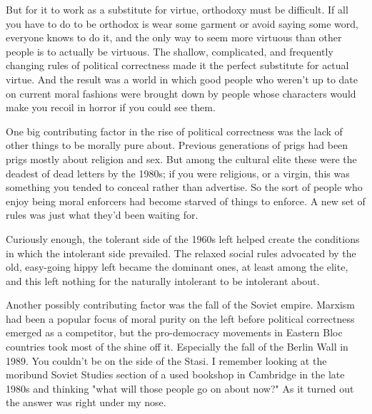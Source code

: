 But for it to work as a substitute for
                  virtue, orthodoxy must be difficult. If all you have to do to
                  be orthodox is wear some garment or avoid saying some word,
                  everyone knows to do it, and the only way to seem more
                  virtuous than other people is to actually be virtuous. The
                  shallow, complicated, and frequently changing rules of
                  political correctness made it the perfect substitute for
                  actual virtue. And the result was a world in which good people
                  who weren't up to date on current moral fashions were brought
                  down by people whose characters would make you recoil in
                  horror if you could see them.

One big contributing
                  factor in the rise of political correctness was the lack of
                  other things to be morally pure about. Previous generations of
                  prigs had been prigs mostly about religion and sex. But among
                  the cultural elite these were the deadest of dead letters by
                  the 1980s; if you were religious, or a virgin, this was
                  something you tended to conceal rather than advertise. So the
                  sort of people who enjoy being moral enforcers had become
                  starved of things to enforce. A new set of rules was just what
                  they'd been waiting for.

Curiously enough, the
                  tolerant side of the 1960s left helped create the conditions
                  in which the intolerant side prevailed. The relaxed social
                  rules advocated by the old, easy-going hippy left became the
                  dominant ones, at least among the elite, and this left nothing
                  for the naturally intolerant to be intolerant about.

Another
                  possibly contributing factor was the fall of the Soviet
                  empire. Marxism had been a popular focus of moral purity on
                  the left before political correctness emerged as a competitor,
                  but the pro-democracy movements in Eastern Bloc countries took
                  most of the shine off it. Especially the fall of the Berlin
                  Wall in 1989. You couldn't be on the side of the Stasi. I
                  remember looking at the moribund Soviet Studies section of a
                  used bookshop in Cambridge in the late 1980s and thinking
                  "what will those people go on about now?" As it turned out the
                  answer was right under my nose.

